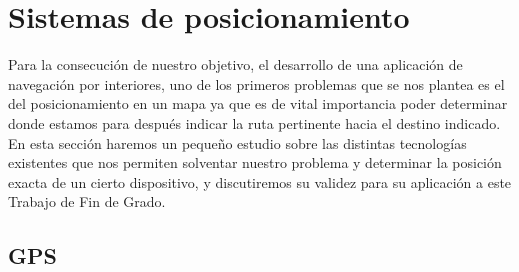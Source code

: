 %


\section{Sistemas de posicionamiento}
\label{sec:sisPos}
Para la consecución de nuestro objetivo, el desarrollo de una aplicación de navegación por interiores, uno de los primeros problemas que se nos plantea es el del posicionamiento en un mapa ya que es de vital importancia poder determinar donde estamos para después indicar la ruta pertinente hacia el destino indicado. En esta sección haremos un pequeño estudio sobre las distintas tecnologías existentes que nos permiten solventar nuestro problema y determinar la posición exacta de un cierto dispositivo, y discutiremos su validez para su aplicación a este Trabajo de Fin de Grado.

\subsection{GPS}

